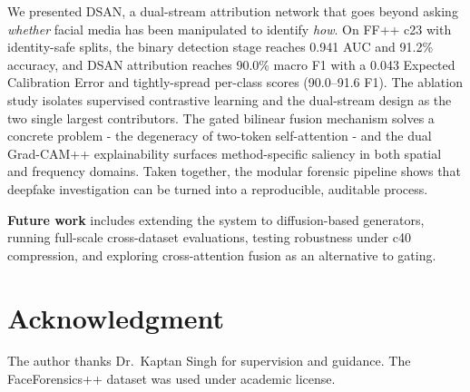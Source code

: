 We presented DSAN, a dual-stream attribution network that goes beyond asking \textit{whether} facial media has been manipulated to identify \textit{how}. On FF++ c23 with identity-safe splits, the binary detection stage reaches 0.941 AUC and 91.2\% accuracy, and DSAN attribution reaches 90.0\% macro F1 with a 0.043 Expected Calibration Error and tightly-spread per-class scores (90.0--91.6 F1). The ablation study isolates supervised contrastive learning and the dual-stream design as the two single largest contributors. The gated bilinear fusion mechanism solves a concrete problem - the degeneracy of two-token self-attention - and the dual Grad-CAM++ explainability surfaces method-specific saliency in both spatial and frequency domains. Taken together, the modular forensic pipeline shows that deepfake investigation can be turned into a reproducible, auditable process.

\textbf{Future work} includes extending the system to diffusion-based generators, running full-scale cross-dataset evaluations, testing robustness under c40 compression, and exploring cross-attention fusion as an alternative to gating.

\section*{Acknowledgment}
The author thanks Dr.\ Kaptan Singh for supervision and guidance. The FaceForensics++ dataset was used under academic license.
